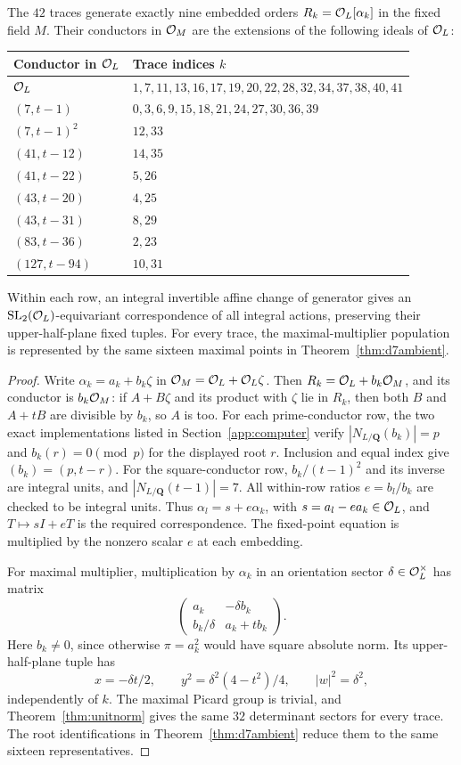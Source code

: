 \begin{proposition}\label{prop:alltraceorders}
The $42$ traces generate exactly nine embedded orders
$R_k=\mathcal O_L[\alpha_k]$ in the fixed field $M$. Their conductors in $\mathcal O_M$
are the extensions of the following ideals of $\mathcal O_L$:
\begin{center}
\begin{tabular}{ll}
\toprule
Conductor in $\mathcal O_L$ & Trace indices $k$\\
\midrule
$\mathcal O_L$ & $1,7,11,13,16,17,19,20,22,28,32,34,37,38,40,41$\\
$(7,t-1)$ & $0,3,6,9,15,18,21,24,27,30,36,39$\\
$(7,t-1)^2$ & $12,33$\\
$(41,t-12)$ & $14,35$\\
$(41,t-22)$ & $5,26$\\
$(43,t-20)$ & $4,25$\\
$(43,t-31)$ & $8,29$\\
$(83,t-36)$ & $2,23$\\
$(127,t-94)$ & $10,31$\\
\bottomrule
\end{tabular}
\end{center}
Within each row, an integral invertible affine change of generator gives
an $\operatorname{SL}_2(\mathcal O_L)$-equivariant correspondence of all integral actions,
preserving their upper-half-plane fixed tuples. For every trace, the
maximal-multiplier population is represented by the same sixteen maximal
points in Theorem~\ref{thm:d7ambient}.
\end{proposition}
\begin{proof}
Write $\alpha_k=a_k+b_k\zeta$ in $\mathcal O_M=\mathcal O_L+\mathcal O_L\zeta$.
Then $R_k=\mathcal O_L+b_k\mathcal O_M$, and its conductor is $b_k\mathcal O_M$:
if $A+B\zeta$ and its product with $\zeta$ lie in $R_k$, then both
$B$ and $A+tB$ are divisible by $b_k$, so $A$ is too.
For each prime-conductor row, the two exact implementations listed in
Section~\ref{app:computer} verify $|N_{L/\mathbf Q}(b_k)|=p$ and
$b_k(r)=0\pmod p$ for the displayed root $r$.
Inclusion and equal index give $(b_k)=(p,t-r)$.
For the square-conductor row, $b_k/(t-1)^2$ and its inverse are integral
units, and $|N_{L/\mathbf Q}(t-1)|=7$.
All within-row ratios $e=b_l/b_k$ are checked to be integral units.
Thus $\alpha_l=s+e\alpha_k$, with $s=a_l-ea_k\in\mathcal O_L$, and
$T\mapsto sI+eT$ is the required correspondence. The fixed-point
equation is multiplied by the nonzero scalar $e$ at each embedding.

For maximal multiplier, multiplication by $\alpha_k$ in an orientation
sector $\delta\in\mathcal O_L^\times$ has matrix
\[
 \begin{pmatrix}a_k&-\delta b_k\\ b_k/\delta&a_k+tb_k\end{pmatrix}.
\]
Here $b_k\ne0$, since otherwise $\pi=a_k^2$ would have square absolute
norm. Its upper-half-plane tuple has
\[
 x=-\delta t/2,\qquad y^2=\delta^2(4-t^2)/4,
 \qquad |w|^2=\delta^2,
\]
independently of $k$. The maximal Picard group is trivial, and
Theorem~\ref{thm:unitnorm} gives the same $32$ determinant sectors for
every trace. The root identifications in Theorem~\ref{thm:d7ambient}
reduce them to the same sixteen representatives.
\end{proof}
